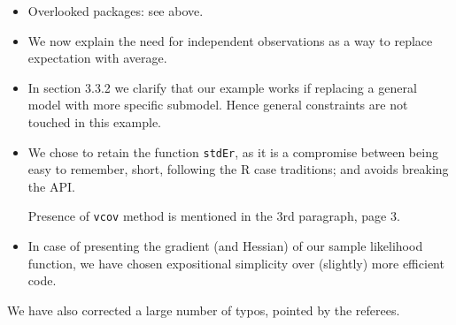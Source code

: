 \documentclass[a4paper]{article}
\begin{document}
\begin{itemize}
\item Overlooked packages: see above.
\item We now explain the need for independent observations as a way to
  replace expectation with average.
\item In section 3.3.2 we clarify that our example works if replacing
  a general model with more specific submodel.  Hence general
  constraints are not touched in this example.
\item We chose to retain the function \texttt{stdEr}, as it is a
  compromise between being easy to remember, short, following the R
  case traditions; and avoids breaking the API.

  Presence of \texttt{vcov} method is mentioned in the 3rd paragraph,
  page 3.
\item In case of presenting the gradient (and Hessian) of our sample
  likelihood function, we have chosen expositional simplicity over
  (slightly) more efficient code.
\end{itemize}

We have also corrected a large number of typos, pointed by the referees.



\end{document}
